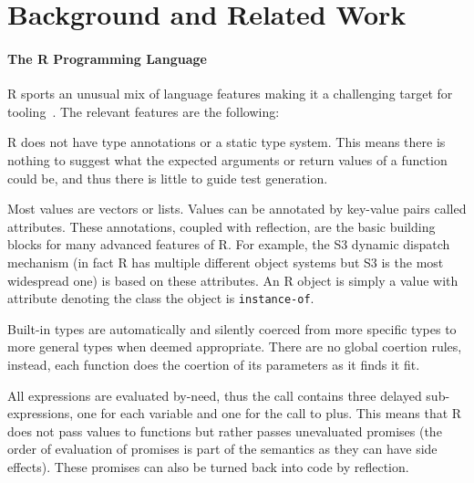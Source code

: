 \documentclass[sigplan,anonymous,review]{acmart}
\begin{document}
\section{Background and Related Work}
\label{sec:background}

\paragraph{The R Programming Language}

R sports an unusual mix of language features making it a challenging target for
tooling~\cite{morandat2012evaluating}. The relevant features are the following:


\begin{compactitem}[$-$]

\item R does not have type annotations or a static type system. This means
    there is nothing to suggest what the expected arguments or return values of
    a function could be, and thus there is little to guide test generation.

\item Most values are vectors or lists. Values can be annotated by key-value
    pairs called attributes. These annotations, coupled with reflection, are
    the basic building blocks for many advanced features of R. For example, the
    S3 dynamic dispatch mechanism (in fact R has multiple different object
    systems but S3 is the most widespread one) is based on these attributes. An
    R object is simply a value with  attribute denoting the class
    the object is \texttt{instance-of}.

\item Built-in types are automatically and silently coerced from more specific
    types to more general types when deemed appropriate. There are no global
    coertion rules, instead, each function does the coertion of its parameters
    as it finds it fit.

\item All expressions are evaluated by-need, thus the call 
    contains three delayed sub-expressions, one for each variable and one for
    the call to plus. This means that R does not pass values to functions but
    rather passes unevaluated promises (the order of evaluation of promises is
    part of the semantics as they can have side effects). These promises can
    also be turned back into code by reflection.


\end{compactitem}
\end{document}
